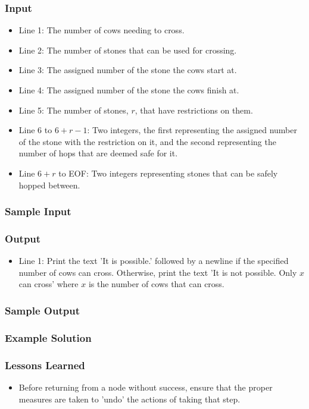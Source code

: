 \subsubsection{Input}
\begin{itemize}
	\item Line 1: The number of cows needing to cross.
	\item Line 2: The number of stones that can be used for crossing.
	\item Line 3: The assigned number of the stone the cows start at.
	\item Line 4: The assigned number of the stone the cows finish at.
	\item Line 5: The number of stones, $r$, that have restrictions on them.
	\item Line 6 to $6 + r - 1$: Two integers, the first representing the assigned number of the stone with the restriction on it, and the second representing the number of hops that are deemed safe for it.
	\item Line $6 + r$ to EOF: Two integers representing stones that can be safely hopped between.
\end{itemize}

\subsubsection{Sample Input}

\subsubsection{Output}
\begin{itemize}
	\item Line 1: Print the text 'It is possible.' followed by a newline if the specified number of cows can cross.
		Otherwise, print the text 'It is not possible. Only $x$ can cross' where $x$ is the number of cows that can cross.
\end{itemize}

\subsubsection{Sample Output}

\subsubsection{Example Solution}

\subsubsection{Lessons Learned}
\begin{itemize}
	\item Before returning from a node without success, ensure that the proper measures are taken to 'undo' the actions of taking that step.
\end{itemize}
